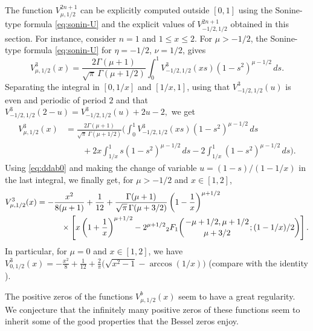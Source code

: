 \documentclass[10pt,a4paper]{article}
\numberwithin{equation}{section}
\theoremstyle{plain}
\theoremstyle{definition}
\newcommand{\FF}[3]{{}_{2}F_{1}\bigg(\genfrac{}{}{0pt}{}{#1}{#2};#3\bigg)}
\begin{document}
The function $V_{\mu,1/2}^{2n+1}$ can be explicitly computed outside $[0,1]$ using the Sonine-type formula \eqref{eq:sonin-U} and the explicit values of $V_{-1/2,1/2}^{2n+1}$ obtained in this section. For instance, consider $n=1$ and $1\le x\le 2$. For $\mu>-1/2$,
the Sonine-type formula \eqref{eq:sonin-U} for $\eta=-1/2$, $\nu=1/2$, gives
\[
   V_{\mu,1/2}^{3}(x) = \frac{2\Gamma(\mu+1)}{\sqrt{\pi}\,\Gamma(\mu+1/2)}
   \int_0^1 V_{-1/2,1/2}^{3}(xs)(1-s^2)^{\mu-1/2}\,ds.
\]
Separating the integral in $[0,1/x]$ and $[1/x,1]$, using that $V_{-1/2,1/2}^{3}(u)$ is even and periodic of period $2$ and that
$
   V_{-1/2,1/2}^{3}(2-u) = V_{-1/2,1/2}^{3}(u)+2u-2,
$
we get
\begin{align*}
   V_{\mu,1/2}^{3}(x) &= \frac{2\Gamma(\mu+1)}{\sqrt{\pi}\,\Gamma(\mu+1/2)}
   \bigg( \int_0^1 V_{-1/2,1/2}^{3}(xs)(1-s^2)^{\mu-1/2}\,ds
   \\
   &\qquad + 2x\int_{1/x}^1 s(1-s^2)^{\mu-1/2}\,ds
   - 2\int_{1/x}^1 (1-s^2)^{\mu-1/2}\,ds \bigg).
\end{align*}
Using \eqref{eq:ddab0} and making the change of variable $u=(1-s)/(1-1/x)$ in the last integral, we finally get, for $\mu>-1/2$ and $x\in[1,2]$,
\begin{align*}
   V_{\mu,1/2}^{3}(x) &= -\frac{x^2}{8(\mu+1)} + \frac{1}{12}
   + \frac{\Gamma(\mu+1)}{\sqrt{\pi}\,\Gamma(\mu+3/2)} \left(1-\frac{1}{x}\right)^{\mu+1/2}
   \\
   &\qquad\quad \times \left[
   x \left( 1+\frac{1}{x} \right)^{\mu+1/2}
   - 2^{\mu+1/2} \FF{-\mu+1/2,\mu+1/2}{\mu+3/2}{(1-1/x)/2}
   \right] .
\end{align*}
In particular, for $\mu=0$ and $x\in[1,2]$, we have
$
   V_{0,1/2}^{3}(x) = -\frac{x^2}{8} + \frac{1}{12}
   + \frac{2}{\pi} \big(\sqrt{x^2-1}-\arccos(1/x)\big)
$
(compare with the identity \cite[19.4(9), p.~634]{Wat}).

The positive zeros of the functions $V_{\mu,1/2}^{b}(x)$ seem to have a great regularity. We conjecture that
the infinitely many positive zeros of these functions seem to inherit some of the good properties that the Bessel zeros enjoy.
\end{document}
